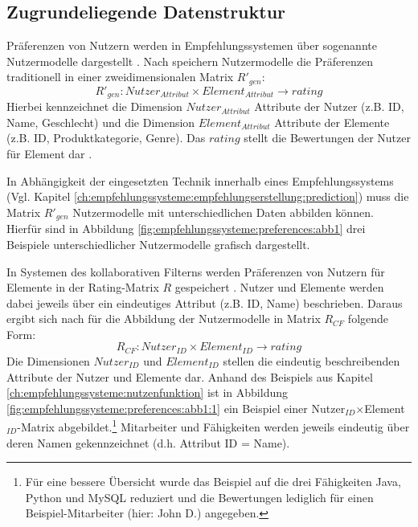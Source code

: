 \subsection{Zugrundeliegende Datenstruktur}%
Präferenzen von Nutzern werden in Empfehlungssystemen über sogenannte Nutzermodelle dargestellt \cite[S. 9]{ricci:book}\cite[S. 2]{jawaheer:article}\cite[S. 246]{berkovsky:article}.
Nach \textcite[S. 249f]{berkovsky:article} speichern Nutzermodelle die Präferenzen traditionell in einer zweidimensionalen Matrix $R'_{gen}$:
\begin{equation}\label{eq4}
    R'_{gen}: Nutzer_{Attribut} \times Element_{Attribut} \rightarrow rating
\end{equation}
Hierbei kennzeichnet die Dimension $Nutzer_{Attribut}$ Attribute der Nutzer (z.B. ID, Name, Geschlecht) und die Dimension $Element_{Attribut}$ Attribute der Elemente (z.B. ID, Produktkategorie, Genre).
Das $rating$ stellt die Bewertungen der Nutzer für Element dar \cite[S. 250]{berkovsky:article}.

In Abhängigkeit der eingesetzten Technik innerhalb eines Empfehlungssystems (Vgl. Kapitel \ref{ch:empfehlungssysteme:empfehlungserstellung:prediction}) muss die Matrix $R'_{gen}$ Nutzermodelle mit unterschiedlichen Daten abbilden können. %
Hierfür sind in Abbildung \ref{fig:empfehlungssysteme:preferences:abb1} drei Beispiele unterschiedlicher Nutzermodelle grafisch dargestellt.

In Systemen des kollaborativen Filterns werden Präferenzen von Nutzern für Elemente in der Rating-Matrix $R$ gespeichert \cite[S. 246ff]{berkovsky:article}.
Nutzer und Elemente werden dabei jeweils über ein eindeutiges Attribut (z.B. ID, Name) beschrieben.
Daraus ergibt sich nach \textcite[S. 250]{berkovsky:article} für die Abbildung der Nutzermodelle in Matrix $R_{CF}$ folgende Form:
\begin{equation}\label{eq5}
    R_{CF}: Nutzer_{ID} \times Element_{ID} \rightarrow rating
\end{equation}
Die Dimensionen $Nutzer_{ID}$ und $Element_{ID}$ stellen die eindeutig beschreibenden Attribute der Nutzer und Elemente dar.
Anhand des Beispiels aus Kapitel \ref{ch:empfehlungssysteme:nutzenfunktion} ist in Abbildung \ref{fig:empfehlungssysteme:preferences:abb1:1} ein Beispiel einer Nutzer$_{ID}$$\times$Element$_{ID}$-Matrix abgebildet.\footnote{Für eine bessere Übersicht wurde das Beispiel auf die drei Fähigkeiten Java, Python und MySQL reduziert und die Bewertungen lediglich für einen Beispiel-Mitarbeiter (hier: John D.) angegeben.}
Mitarbeiter und Fähigkeiten werden jeweils eindeutig über deren Namen gekennzeichnet (d.h. Attribut ID = Name).

